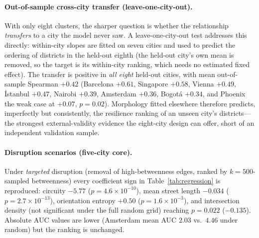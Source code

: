 \documentclass[sn-mathphys-num,pdflatex]{sn-jnl}
\begin{document}
\paragraph{Out-of-sample cross-city transfer (leave-one-city-out).} With only eight
clusters, the sharper question is whether the relationship \emph{transfers} to a city
the model never saw. A leave-one-city-out test addresses this directly: within-city
slopes are fitted on seven cities and used to predict the ordering of districts in the
held-out eighth (the held-out city's own mean is removed, so the target is its
within-city ranking, which needs no estimated fixed effect). The transfer is positive
in \emph{all eight} held-out cities, with mean out-of-sample Spearman $+0.42$
(Barcelona $+0.61$, Singapore $+0.58$, Vienna $+0.49$, İstanbul $+0.47$, Nairobi
$+0.39$, Amsterdam $+0.36$, Bogotá $+0.34$, and Phoenix the weak case at $+0.07$,
$p=0.02$). Morphology fitted elsewhere therefore predicts, imperfectly but consistently,
the resilience ranking of an unseen city's districts---the strongest external-validity
evidence the eight-city design can offer, short of an independent validation sample.

\paragraph{Disruption scenarios (five-city core).} Under \emph{targeted} disruption (removal of
high-betweenness edges, ranked by $k{=}500$-sampled betweenness) every coefficient
sign in Table~\ref{tab:regression} is reproduced: circuity $-5.77$
($p=4.6\times10^{-10}$), mean street length $-0.034$ ($p=2.7\times10^{-13}$),
orientation entropy $+0.50$ ($p=1.6\times10^{-3}$), and intersection density
(not significant under the full random grid) reaching $p=0.022$ ($-0.135$). Absolute
AUC values are lower (Amsterdam mean AUC $2.03$ vs.\ $4.46$ under random) but the
ranking is unchanged.
\end{document}
